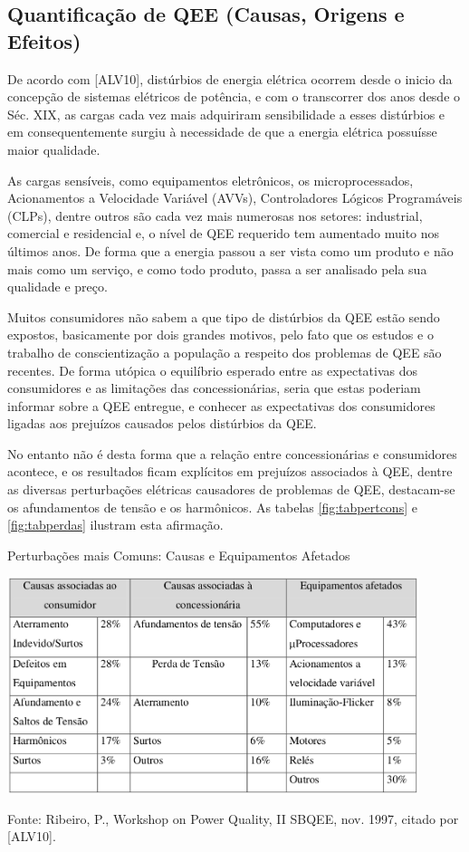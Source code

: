 \subsection{Quantificação de QEE (Causas, Origens e Efeitos)}
\par
De acordo com [ALV10], distúrbios de energia elétrica ocorrem desde o inicio da concepção de sistemas elétricos de potência, e com o transcorrer dos anos desde o Séc. XIX, as cargas cada vez mais adquiriram sensibilidade a esses distúrbios e em consequentemente surgiu à necessidade de que a energia elétrica possuísse maior qualidade.
\par
As cargas sensíveis, como equipamentos eletrônicos, os microprocessados, Acionamentos a Velocidade Variável (AVVs), Controladores Lógicos Programáveis (CLPs), dentre outros são cada vez mais numerosas nos setores: industrial, comercial e residencial e, o nível de QEE requerido tem aumentado muito nos últimos anos. De forma que a energia passou a ser vista como um produto e não mais como um serviço, e como todo produto, passa a ser analisado pela sua qualidade e preço.
\par
Muitos consumidores não sabem a que tipo de distúrbios da QEE estão sendo expostos, basicamente por dois grandes motivos, pelo fato que os estudos e o trabalho de conscientização a população a respeito dos problemas de QEE são recentes. De forma utópica o equilíbrio esperado entre as expectativas dos consumidores e as limitações das concessionárias, seria que estas poderiam informar sobre a QEE entregue, e conhecer as expectativas dos consumidores ligadas aos prejuízos causados pelos distúrbios da QEE.
\par
No entanto não é desta forma que a relação entre concessionárias e consumidores acontece, e os resultados ficam explícitos em prejuízos associados à QEE, dentre as diversas perturbações elétricas causadores de problemas de QEE, destacam-se os afundamentos de tensão e os harmônicos. As tabelas \ref{fig:tabpertcons} e \ref{fig:tabperdas} ilustram esta afirmação.

\begin{table}[hbt]
\begin{center}
\caption{Perturbações mais Comuns: Causas e Equipamentos Afetados}
\includegraphics[width=12cm]{imagens/tab2-cap2.png}
\par{\small Fonte: Ribeiro, P., Workshop on Power Quality, II SBQEE, nov. 1997, citado por [ALV10].}
\label{fig:tabpertcons}
\end{center}
\end{table}

